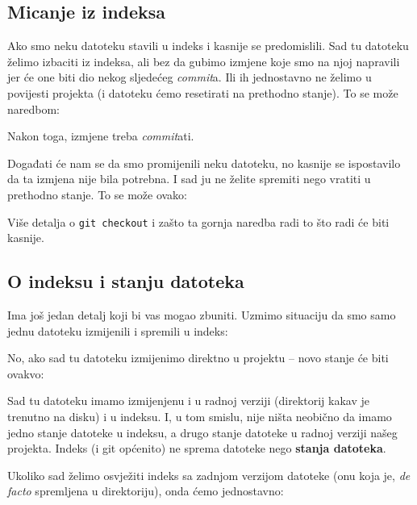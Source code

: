 \subsection*{Micanje iz indeksa}

Ako smo neku datoteku stavili u indeks i kasnije se predomislili. 
Sad tu datoteku želimo izbaciti iz indeksa, ali bez da gubimo izmjene koje smo na njoj napravili jer će one biti dio nekog sljedećeg \emph{commit}a.
Ili ih jednostavno ne želimo u povijesti projekta (i datoteku ćemo resetirati na prethodno stanje).
To se može naredbom:


Nakon toga, izmjene treba \emph{commit}ati.

Događati će nam se da smo promijenili neku datoteku, no kasnije se ispostavilo da ta izmjena nije bila potrebna. 
I sad ju ne želite spremiti nego vratiti u prethodno stanje.
To se može ovako:


Više detalja o \verb+git checkout+ i zašto ta gornja naredba radi to što radi će biti kasnije.

\subsection*{O indeksu i stanju datoteka}

Ima još jedan detalj koji bi vas mogao zbuniti. 
Uzmimo situaciju da smo samo jednu datoteku izmijenili i spremili u indeks:



No, ako sad tu datoteku izmijenimo direktno u projektu -- novo stanje će biti ovakvo:



Sad tu datoteku imamo izmijenjenu i u radnoj verziji (direktorij kakav je trenutno na disku) i u indeksu.
I, u tom smislu, nije ništa neobično da imamo jedno stanje datoteke u indeksu, a drugo stanje datoteke u radnoj verziji našeg projekta.
Indeks (i git općenito) ne sprema datoteke nego \textbf{stanja datoteka}.

Ukoliko sad želimo osvježiti indeks sa zadnjom verzijom datoteke (onu koja je, \emph{de facto} spremljena u direktoriju), onda ćemo jednostavno:

